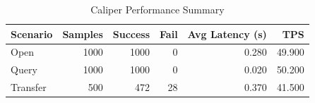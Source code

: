 \begin{table}
\caption{Caliper Performance Summary}
\label{tab:caliper_round}
\begin{tabular}{lrrrrr}
\toprule
Scenario & Samples & Success & Fail & Avg Latency (s) & TPS \\
\midrule
Open & 1000 & 1000 & 0 & 0.280 & 49.900 \\
Query & 1000 & 1000 & 0 & 0.020 & 50.200 \\
Transfer & 500 & 472 & 28 & 0.370 & 41.500 \\
\bottomrule
\end{tabular}
\end{table}
